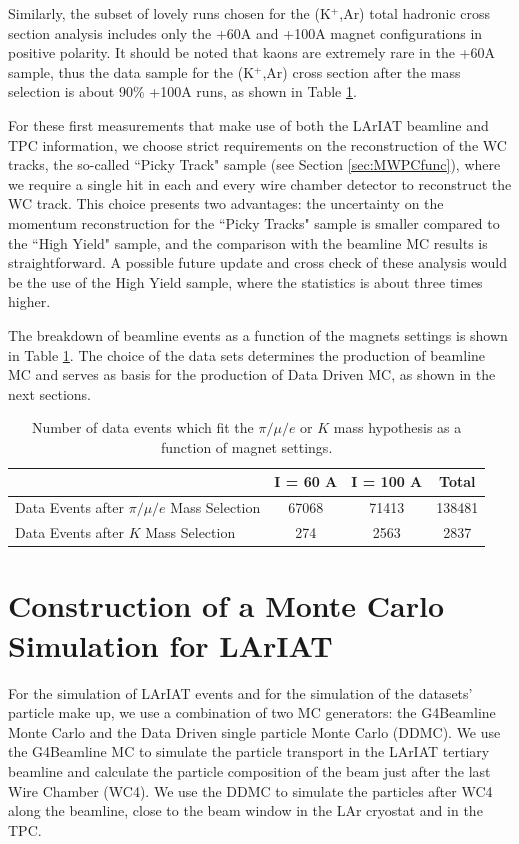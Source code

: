 Similarly, the subset of lovely runs chosen  for the (K$^{+}$,Ar)  total hadronic cross section analysis includes only the +60A and +100A magnet configurations in positive polarity. It should be noted that kaons are extremely rare in the +60A sample, thus the data sample for the (K$^{+}$,Ar) cross section after the mass selection is about 90\% +100A runs, as shown in Table \ref{tab:databreakdown}.

For these first measurements that make use of both the LArIAT beamline and TPC information, we choose strict requirements on the reconstruction of the WC tracks, the so-called ``Picky Track" sample (see Section \ref{sec:MWPCfunc}), where we require a single hit in each and every wire chamber detector to reconstruct the WC track. This choice presents two advantages:  the uncertainty on the momentum reconstruction for the ``Picky Tracks" sample is smaller compared to the ``High Yield" sample, and the comparison with the beamline MC results is straightforward. A possible future update and cross check of these analysis would be the use of the High Yield sample, where the statistics is about three times higher. 

The breakdown of beamline events as a function of the magnets settings is shown in Table \ref{tab:databreakdown}. 
The choice of the data sets determines the production of beamline MC and serves as basis for the production of Data Driven MC, as shown in the next sections.

\begin{table}[b]
\centering
\begin{tabular}{|l|c|c|c|}  
\hline
                                                              & I = 60 A          & I = 100 A   & Total     \\ \hline
Data Events after $\pi/\mu/e$ Mass Selection     &     67068          &  71413  & 138481 \\ \hline
Data Events after $K$ Mass Selection                &     274              &   2563   & 2837  \\ \hline
\end{tabular}
\caption{Number of data events which fit the $\pi/\mu/e$ or $K$ mass hypothesis as a function of magnet settings.}
\label{tab:databreakdown}
\end{table}



\section{Construction of a Monte Carlo Simulation for LArIAT}\label{sec:MCSet}
For the simulation of LArIAT events and for the simulation of the datasets' particle make up, we use a combination of two MC generators: the G4Beamline Monte Carlo and the Data Driven single particle Monte Carlo (DDMC). We use the G4Beamline MC to simulate the particle transport in the LArIAT tertiary beamline and calculate the particle composition of the beam just after the last Wire Chamber (WC4). We use the DDMC  to simulate the particles after WC4 along the beamline, close to the beam window in the LAr cryostat and in the TPC.


